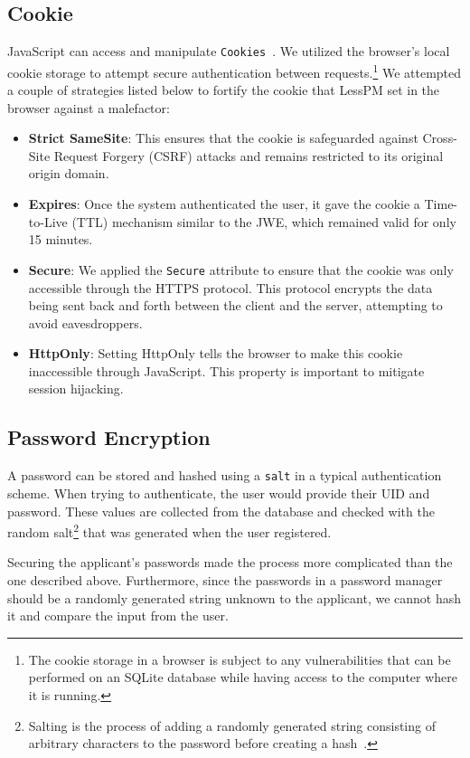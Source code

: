 \subsection{Cookie}\label{subsec:cookie}
JavaScript can access and manipulate \texttt{Cookies}~\cite{he2019malicious}.
We utilized the browser's local cookie storage to attempt secure authentication
between requests.\footnote{
  The cookie storage in a browser is subject to any vulnerabilities that can be
  performed on an SQLite database while having access to the computer where it
  is running.
}
We attempted a couple of strategies listed below to fortify the cookie that
LessPM set in the browser against a malefactor:
\begin{itemize}
  \item \textbf{Strict SameSite}:
  This ensures that the cookie is safeguarded against Cross-Site Request Forgery
  (CSRF) attacks and remains restricted to its original origin domain.
  \item \textbf{Expires}:
  Once the system authenticated the user, it gave the cookie a Time-to-Live
  (TTL) mechanism similar to the JWE, which remained valid for only 15 minutes.
  \item \textbf{Secure}:
  We applied the \texttt{Secure} attribute to ensure that the cookie was only
  accessible through the HTTPS protocol.
  This protocol encrypts the data being sent back and forth between the client
  and the server, attempting to avoid eavesdroppers.
  \item \textbf{HttpOnly}:
  Setting HttpOnly tells the browser to make this cookie inaccessible through
  JavaScript.
  This property is important to mitigate session hijacking.
\end{itemize}

\subsection{Password Encryption}\label{subsec:password-encryption}
A password can be stored and hashed using a \texttt{salt} in a typical
authentication scheme.
When trying to authenticate, the user would provide their UID and password.
These values are collected from the database and checked with the random
salt\footnote{
  Salting is the process of adding a randomly generated string consisting of
  arbitrary characters to the password before creating a hash~\cite{Kharod2015}.
} that was generated when the user registered.

Securing the applicant's passwords made the process more complicated than the
one described above.
Furthermore, since the passwords in a password manager should be a randomly
generated string unknown to the applicant, we cannot hash it and compare the
input from the user.

